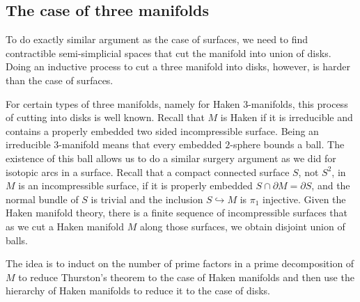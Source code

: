 \documentclass[a4paper]{amsart}
\theoremstyle{definition}
\theoremstyle{remark}
\newcommand{\tH}{\text{\textnormal{Homeo}}}
\newcommand{\BH}{\mathrm{B}\text{\textnormal{Homeo}}}
\newcommand{\BdH}{\mathrm{B}\text{\textnormal{Homeo}}^{\delta}}
\numberwithin{equation}{section}
\begin{document}
\subsection{The case of three manifolds} To do exactly similar argument as the case of surfaces, we need to find contractible semi-simplicial spaces that cut the manifold into union of disks. Doing an inductive process to cut a three manifold into disks, however, is harder than the case of surfaces. 

For certain types of three manifolds,  namely for Haken $3$-manifolds, this process of cutting into disks is well known. Recall that $M$ is Haken if it is irreducible and contains a properly embedded two sided incompressible surface. Being an irreducible $3$-manifold means that every embedded $2$-sphere bounds a ball. The existence of this ball allows us to do a similar surgery argument as we did for isotopic arcs in a surface. Recall that a compact connected surface $S$, not $S^2$, in $M$ is an incompressible surface, if it is properly embedded $S\cap \partial  M=\partial S$, and the normal bundle of $S$ is trivial and the inclusion $S\hookrightarrow M$ is $\pi_1$ injective. Given the Haken manifold theory, there is a finite sequence of incompressible surfaces that as we cut a Haken manifold $M$ along those surfaces, we obtain disjoint union of balls. 

The idea is to  induct on the number of prime factors in a prime decomposition of $M$ to reduce Thurston's theorem to the case of Haken manifolds and then use the hierarchy of Haken manifolds to reduce it to the case of disks. 
\end{document}
